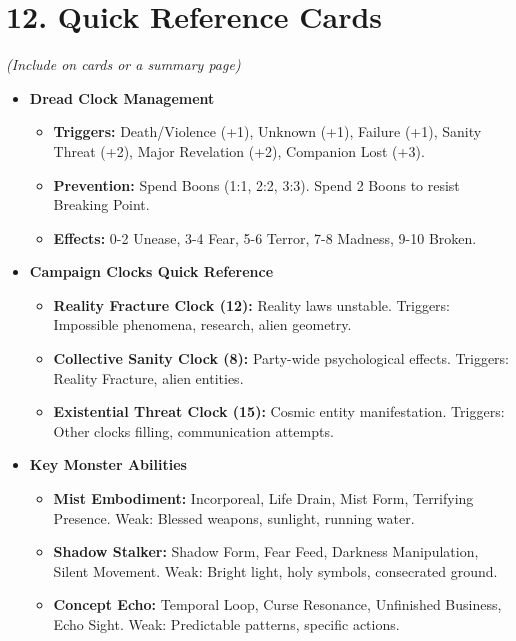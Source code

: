 \documentclass[11pt]{article}
\begin{document}
\section*{12. Quick Reference Cards}

\textit{(Include on cards or a summary page)}

\begin{itemize}
\item \textbf{Dread Clock Management}
\begin{itemize}
\item \textbf{Triggers:} Death/Violence (+1), Unknown (+1), Failure (+1), Sanity Threat (+2), Major Revelation (+2), Companion Lost (+3).
\item \textbf{Prevention:} Spend Boons (1:1, 2:2, 3:3). Spend 2 Boons to resist Breaking Point.
\item \textbf{Effects:} 0-2 Unease, 3-4 Fear, 5-6 Terror, 7-8 Madness, 9-10 Broken.
\end{itemize}

\item \textbf{Campaign Clocks Quick Reference}
\begin{itemize}
\item \textbf{Reality Fracture Clock (12):} Reality laws unstable. Triggers: Impossible phenomena, research, alien geometry.
\item \textbf{Collective Sanity Clock (8):} Party-wide psychological effects. Triggers: Reality Fracture, alien entities.
\item \textbf{Existential Threat Clock (15):} Cosmic entity manifestation. Triggers: Other clocks filling, communication attempts.
\end{itemize}

\item \textbf{Key Monster Abilities}
\begin{itemize}
\item \textbf{Mist Embodiment:} Incorporeal, Life Drain, Mist Form, Terrifying Presence. Weak: Blessed weapons, sunlight, running water.
\item \textbf{Shadow Stalker:} Shadow Form, Fear Feed, Darkness Manipulation, Silent Movement. Weak: Bright light, holy symbols, consecrated ground.
\item \textbf{Concept Echo:} Temporal Loop, Curse Resonance, Unfinished Business, Echo Sight. Weak: Predictable patterns, specific actions.
\end{itemize}


\end{itemize}
\end{document}
